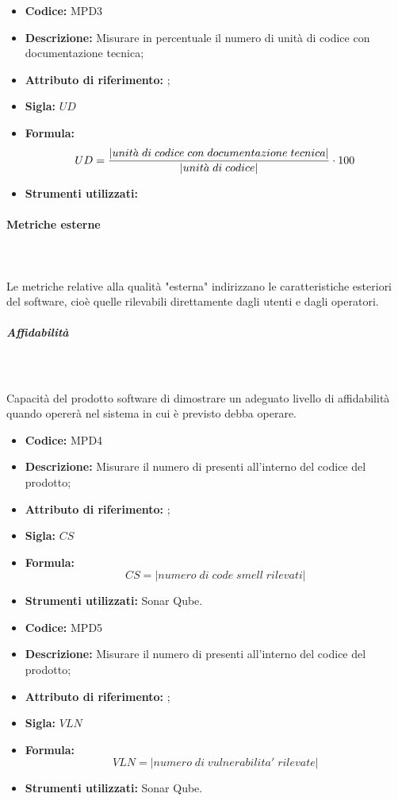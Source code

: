 \begin{itemize}
    \item \textbf{Codice:} MPD3
    \item \textbf{Descrizione:} Misurare in percentuale il numero di unità di codice con documentazione tecnica;
    \item \textbf{Attributo di riferimento:} ;
    \item \textbf{Sigla:} $UD$
    \item \textbf{Formula:} $$UD = {|unit\grave{a} \; di \; codice \; con \; documentazione \; tecnica| \over |unit\grave{a} \; di \; codice|} \cdot 100$$
    \item \textbf{Strumenti utilizzati:}
\end{itemize}
              
       
\paragraph{Metriche esterne}\mbox{}\\ \\
Le metriche relative alla qualità "esterna" indirizzano le caratteristiche esteriori del software, cioè quelle rilevabili direttamente dagli utenti e dagli operatori.

\subparagraph{Affidabilità}\mbox{}\\ \\
Capacità del prodotto software di dimostrare un adeguato livello di affidabilità quando opererà nel sistema in cui è previsto debba operare.
  
\begin{itemize}
    \item \textbf{Codice:} MPD4
    \item \textbf{Descrizione:} Misurare il numero di  presenti all'interno del codice del prodotto;
    \item \textbf{Attributo di riferimento:} ;
    \item \textbf{Sigla:} $CS$
    \item \textbf{Formula:} $$CS = {|numero \; di \; code \; smell \; rilevati|}$$
    \item \textbf{Strumenti utilizzati:} Sonar Qube.
\end{itemize}

\begin{itemize}
    \item \textbf{Codice:} MPD5
    \item \textbf{Descrizione:} Misurare il numero di  presenti all'interno del codice del prodotto;
    \item \textbf{Attributo di riferimento:} ;
    \item \textbf{Sigla:} $VLN$
    \item \textbf{Formula:} $$VLN = {|numero \; di \; vulnerabilita' \; rilevate|}$$
    \item \textbf{Strumenti utilizzati:} Sonar Qube.
\end{itemize}


